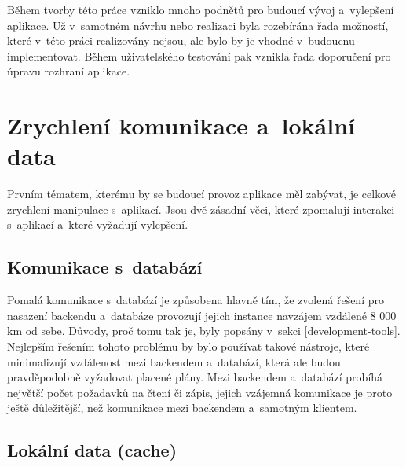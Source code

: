 Během tvorby této práce vzniklo mnoho podnětů pro budoucí vývoj a~vylepšení aplikace. Už v~samotném návrhu nebo realizaci byla rozebírána řada možností, které v~této práci realizovány nejsou, ale bylo by je vhodné v~budoucnu implementovat. Během uživatelského testování pak vznikla řada doporučení pro úpravu rozhraní aplikace.

\section{Zrychlení komunikace a~lokální data}

Prvním tématem, kterému by se budoucí provoz aplikace měl zabývat, je celkové zrychlení manipulace s~aplikací. Jsou dvě zásadní věci, které zpomalují interakci s~aplikací a~které vyžadují vylepšení.

\subsection{Komunikace s~databází}

Pomalá komunikace s~databází je způsobena hlavně tím, že zvolená řešení pro nasazení backendu a~databáze provozují jejich instance navzájem vzdálené 8 000 km od sebe. Důvody, proč tomu tak je, byly popsány v~sekci \ref{development-tools}. Nejlepším řešením tohoto problému by bylo používat takové nástroje, které minimalizují vzdálenost mezi backendem a~databází, která ale budou pravděpodobně vyžadovat placené plány. Mezi backendem a~databází probíhá největší počet požadavků na čtení či zápis, jejich vzájemná komunikace je proto ještě důležitější, než komunikace mezi backendem a~samotným klientem.

\subsection{Lokální data (cache)}

